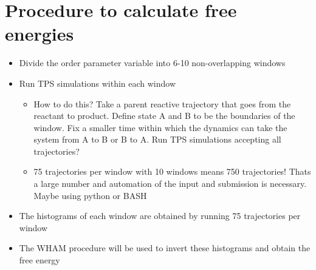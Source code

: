 \documentclass{article}
\begin{document}

\section{Procedure to calculate free energies}
\begin{itemize}
\item Divide the order parameter variable into 6-10 non-overlapping windows
\item Run TPS simulations within each window
\begin{itemize}
	\item How to do this? Take a parent reactive trajectory that goes from the reactant to product. Define state A and B to be the boundaries of the window. Fix a smaller time within which the dynamics can take the system
	from A to B or B to A. Run TPS simulations accepting all trajectories? 
	\item 75 trajectories per window with 10 windows means 750 trajectories! Thats a large number and automation of the input and submission is necessary.
	Maybe using python or BASH
	\end{itemize}
\item The histograms of each window are obtained by running 75 trajectories per window
\item The WHAM procedure will be used to invert these histograms and obtain the free energy
	\end{itemize}




\end{document}

